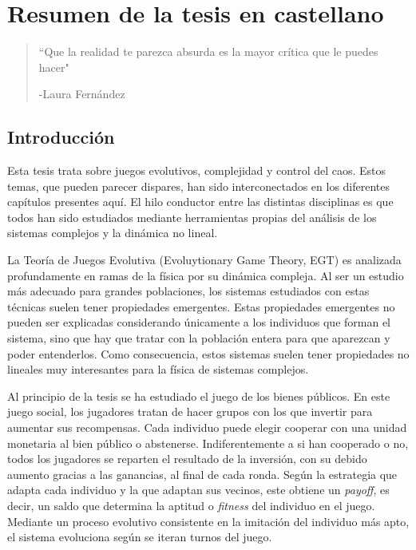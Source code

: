 \chapter*{Resumen de la tesis en castellano}


\begin{quotation}
	\vspace{-3cm}
    \begin{flushright}
    \begin{minipage}[t][5cm][b]{0.5\textwidth}
    { ``Que la realidad te parezca absurda es la mayor crítica que le puedes hacer"}
    
    \bigskip
    
    -{\small  Laura Fernández}
    \end{minipage}
    \end{flushright}
    
    \vspace{0.5cm}
\end{quotation}




\section{Introducción}

Esta tesis trata sobre juegos evolutivos, complejidad y control del caos. Estos temas, que pueden parecer dispares, han sido interconectados en los diferentes capítulos presentes aquí. El hilo conductor entre las distintas disciplinas es que todos han sido estudiados mediante herramientas propias del análisis de los sistemas complejos y la dinámica no lineal. 

La Teoría de Juegos Evolutiva (Evoluytionary Game Theory, EGT) es analizada profundamente en ramas de la física por su dinámica compleja. Al ser un estudio más adecuado para grandes poblaciones, los sistemas estudiados con estas técnicas suelen tener propiedades emergentes. Estas propiedades emergentes no pueden ser explicadas considerando únicamente a los individuos que forman el sistema, sino que hay que tratar con la población entera para que aparezcan y poder entenderlos. Como consecuencia, estos sistemas suelen tener propiedades no lineales muy interesantes para la física de sistemas complejos.

Al principio de la tesis se ha estudiado el juego de los bienes públicos. En este juego social, los jugadores tratan de hacer grupos con los que invertir para aumentar sus recompensas. Cada individuo puede elegir cooperar con una unidad monetaria al bien público o abstenerse. Indiferentemente a si han cooperado o no, todos los jugadores se reparten el resultado de la inversión, con su debido aumento gracias a las ganancias, al final de cada ronda. Según la estrategia que adapta cada individuo y la que adaptan sus vecinos, este obtiene un \textit{payoff}, es decir, un saldo que determina la aptitud o \textit{fitness} del individuo en el juego. Mediante un proceso evolutivo consistente en la imitación del individuo más apto, el sistema evoluciona según se iteran turnos del juego.

